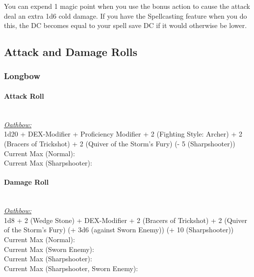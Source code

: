 \documentclass[letterpaper,openany,oneside,twocolumn]{book}
\begin{document}
You can expend 1 magic point when you use the bonus action to cause the attack deal an extra 1d6 cold damage. If you have the Spellcasting feature when you do this, the DC becomes equal to your spell save DC if it would otherwise be lower.

\subsection*{Attack and Damage Rolls}
\subsubsection*{Longbow}
\paragraph*{Attack Roll}\hfill\\
\underline{\textit{Oathbow:}}\\
1d20 + DEX-Modifier + Proficiency Modifier + 2 (Fighting Style: Archer) + 2 (Bracers of Trickshot) + 2 (Quiver of the Storm's Fury) (- 5 (Sharpshooter)) \\
\indent Current Max (Normal):  \\
\indent Current Max (Sharpshooter):  \\
\paragraph*{Damage Roll}\hfill\\
\underline{\textit{Oathbow:}}\\
1d8 + 2 (Wedge Stone) + DEX-Modifier + 2 (Bracers of Trickshot) + 2 (Quiver of the Storm's Fury) (+ 3d6 (against Sworn Enemy)) (+ 10 (Sharpshooter))\\
\indent Current Max (Normal):  \\
\indent Current Max (Sworn Enemy):  \\
\indent Current Max (Sharpshooter):  \\
\indent Current Max (Sharpshooter, Sworn Enemy): 
\end{document}
